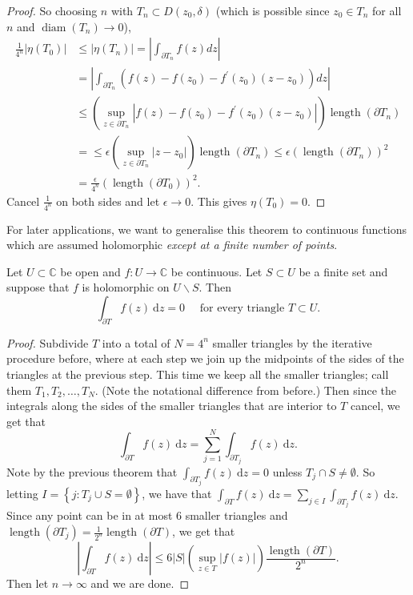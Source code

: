 \documentclass[a4paper]{scrartcl}
\begin{document}
\begin{proof}
     So choosing $n$ with $T_{n} \subset D\left(z_{0}, \delta\right)$ (which is possible since $z_{0} \in T_{n}$ for all $n$ and $\operatorname{diam}\left(T_{n}\right) \rightarrow 0$),
     \begin{align*}
          \frac{1}{4^{n}}\left|\eta\left(T_{0}\right)\right| &\leq\left|\eta\left(T_{n}\right)\right|=\left|\int_{\partial T_{n}} f(z) d z\right|\\
          &=\left|\int_{\partial T_{n}}\left(f(z)-f\left(z_{0}\right)-f^{\prime}\left(z_{0}\right)\left(z-z_{0}\right)\right) d z\right|\\
          &\leq\left(\sup _{z \in \partial T_{n}}\left|f(z)-f\left(z_{0}\right)-f^{\prime}\left(z_{0}\right)\left(z-z_{0}\right)\right|\right) \operatorname{length}\left(\partial T_{n}\right)\\
          &=\leq \epsilon\left(\sup _{z \in \partial T_{n}}\left|z-z_{0}\right|\right)\operatorname{length}\left(\partial T_{n}\right) \leq \epsilon\left(\operatorname{length}\left(\partial T_{n}\right)\right)^{2}\\
          &=\frac{\epsilon}{4^{n}}\left(\operatorname{length}\left(\partial T_{0}\right)\right)^{2}.
     \end{align*}
     Cancel $\frac{1}{4^{n}}$ on both sides and let $\epsilon \rightarrow 0$. This gives $\eta\left(T_{0}\right)=0$.
\end{proof}
For later applications, we want to generalise this theorem to continuous functions which are assumed holomorphic \emph{except at a finite number of points}.
\begin{theorem}
      Let $U \subset \mathbb{C}$ be open and $f: U \rightarrow \mathbb{C}$ be continuous. Let $S \subset U$ be a finite set and suppose that $f$ is holomorphic on $U\backslash S$. Then \[
      \int_{\partial T}^{}f (z) \ \mathrm{d} z =0 \quad \text{ for every triangle } T \subset U
      .\] 
\end{theorem}
\begin{proof}
      Subdivide $T$ into a total of $N=4^{n}$ smaller triangles by the iterative procedure before, where at each step we join up the midpoints of the sides of the triangles at the previous step. This time we keep all the smaller triangles; call them $T_1 , T_2 , \ldots , T_N$. (Note the notational difference from before.) Then since the integrals along the sides of the smaller triangles that are interior to $T$ cancel, we get that \[
      \int_{\partial T}^{}f (z) \ \mathrm{d}z = \sum_{j=1}^{N} \int_{ \partial T_{j}}^{}f (z) \ \mathrm{d}z
      .\] Note by the previous theorem that $\int_{ \partial T_{j}}^{}f (z) \ \mathrm{d}z=0$ unless $T_{j}\cap S \neq \emptyset$. So letting $I=\left\{j: T_{j} \cup S = \emptyset\right\}$, we have that $\int_{\partial T}^{}f (z) \ \mathrm{d}z=\sum_{j \in I}^{}\int_{ \partial T_{j}}^{}f (z) \ \mathrm{d}z$. Since any point can be in at most 6 smaller triangles and $\operatorname{length}( \partial T_{j})=\frac{1}{2^{n}}\operatorname{length} ( \partial T)$, we get that \[
      \left|\int_{ \partial T}^{}f (z) \ \mathrm{d}z \right| \leq 6 \left|S\right|\left(\sup_{z \in T} \left|f (z)\right|\right) \frac{\operatorname{length} ( \partial T)}{2^{n}}
      .\] Then let $n \rightarrow \infty$ and we are done.
\end{proof}
\end{document}
